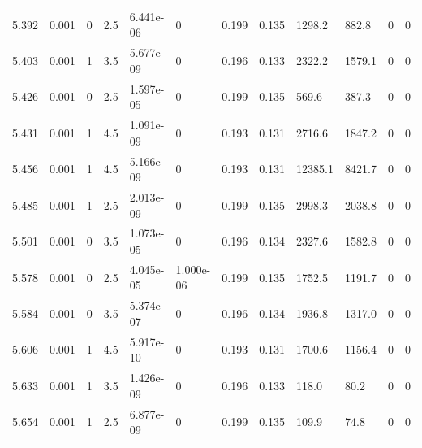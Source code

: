 \documentclass[preview]{standalone}
\begin{document}
{{{{{\begin{tabular}{L{1.2cm}C{1.2cm} C{0.3cm}C{0.5cm} C{1.4cm}C{1.4cm} C{1.4cm}C{1.4cm} C{1.6cm}C{1.6cm} C{1.6cm}C{1.6cm}}
  5.392  &  0.001  & 0     & 2.5 &  6.441e-06  & 0  &  0.199&   0.135& 1298.2 & 882.8   &  0 & 0  \\ 
  5.403  &  0.001  & 1     & 3.5 &  5.677e-09  & 0  &  0.196&   0.133& 2322.2 & 1579.1   &  0 & 0  \\ 
  5.426  &  0.001  & 0     & 2.5 &  1.597e-05  & 0  &  0.199&   0.135& 569.6 & 387.3   &  0 & 0  \\ 
  5.431  &  0.001  & 1     & 4.5 &  1.091e-09  & 0  &  0.193&   0.131& 2716.6 & 1847.2   &  0 & 0  \\ 
  5.456  &  0.001  & 1     & 4.5 &  5.166e-09  & 0  &  0.193&   0.131& 12385.1 & 8421.7   &  0 & 0  \\ 
  5.485  &  0.001  & 1     & 2.5 &  2.013e-09  & 0  &  0.199&   0.135& 2998.3 & 2038.8   &  0 & 0  \\ 
  5.501  &  0.001  & 0     & 3.5 &  1.073e-05  & 0  &  0.196&   0.134& 2327.6 & 1582.8   &  0 & 0  \\ 
  5.578  &  0.001  & 0     & 2.5 &  4.045e-05  & 1.000e-06  &  0.199&   0.135& 1752.5 & 1191.7   &  0 & 0  \\ 
  5.584  &  0.001  & 0     & 3.5 &  5.374e-07  & 0  &  0.196&   0.134& 1936.8 & 1317.0   &  0 & 0  \\ 
  5.606  &  0.001  & 1     & 4.5 &  5.917e-10  & 0  &  0.193&   0.131& 1700.6 & 1156.4   &  0 & 0  \\ 
  5.633  &  0.001  & 1     & 3.5 &  1.426e-09  & 0  &  0.196&   0.133& 118.0 & 80.2   &  0 & 0  \\ 
  5.654  &  0.001  & 1     & 2.5 &  6.877e-09  & 0  &  0.199&   0.135& 109.9 & 74.8   &  0 & 0  \\ 
\hline 
\end{tabular} 

}}}}}
\end{document}

